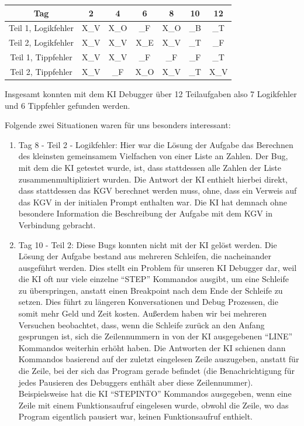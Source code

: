 \documentclass[a4paper,12pt,ngerman]{scrartcl}
\begin{document}
\begin{center}
\begin{tabular}{|c|c|c|c|c|c|c|}
	\hline
 	Tag                 &  2  &  4  &  6  &  8  & 10  & 12  \\
	\hline
	Teil 1, Logikfehler & X_V & X_O &  _F & X_O &  _B &  _T \\
	Teil 2, Logikfehler & X_V & X_V & X_E & X_V &  _T &  _F \\
	Teil 1, Tippfehler  & X_V & X_V &  _F &  _F &  _F &  _T \\
	Teil 2, Tippfehler  & X_V &  _F & X_O & X_V &  _T & X_V \\
	\hline
\end{tabular}
\end{center}

Insgesamt konnten mit dem KI Debugger über 12 Teilaufgaben also 7 Logikfehler und 6 Tippfehler gefunden werden.

Folgende zwei Situationen waren für uns besonders interessant:
\begin{enumerate}
\item Tag 8 - Teil 2 - Logikfehler: Hier war die Lösung der Aufgabe das Berechnen des kleinsten gemeinsamem Vielfachen von einer Liste an Zahlen. Der Bug, mit dem die KI getestet wurde, ist, dass stattdessen alle Zahlen der Liste zusammenmultipliziert wurden. Die Antwort der KI enthielt hierbei direkt, dass stattdessen das KGV berechnet werden muss, ohne, dass ein Verweis auf das KGV in der initialen Prompt enthalten war. Die KI hat demnach ohne besondere Information die Beschreibung der Aufgabe mit dem KGV in Verbindung gebracht.
\item Tag 10 - Teil 2: Diese Bugs konnten nicht mit der KI gelöst werden. Die Lösung der Aufgabe bestand aus mehreren Schleifen, die nacheinander ausgeführt werden. Dies stellt ein Problem für unseren KI Debugger dar, weil die KI oft nur viele einzelne ``STEP'' Kommandos ausgibt, um eine Schleife zu überspringen, anstatt einen Breakpoint nach dem Ende der Schleife zu setzen. Dies führt zu längeren Konversationen und Debug Prozessen, die somit mehr Geld und Zeit kosten. Außerdem haben wir bei mehreren Versuchen beobachtet, dass, wenn die Schleife zurück an den Anfang gesprungen ist, sich die Zeilennummern in von der KI ausgegebenen ``LINE'' Kommandos weiterhin erhöht haben. Die Antworten der KI schienen dann Kommandos basierend auf der zuletzt eingelesen Zeile auszugeben, anstatt für die Zeile, bei der sich das Program gerade befindet (die Benachrichtigung für jedes Pausieren des Debuggers enthält aber diese Zeilennummer). Beispielsweise hat die KI ``STEPINTO'' Kommandos ausgegeben, wenn eine Zeile mit einem Funktionsaufruf eingelesen wurde, obwohl die Zeile, wo das Program eigentlich pausiert war, keinen Funktionsaufruf enthielt.
\end{enumerate}
\end{document}
